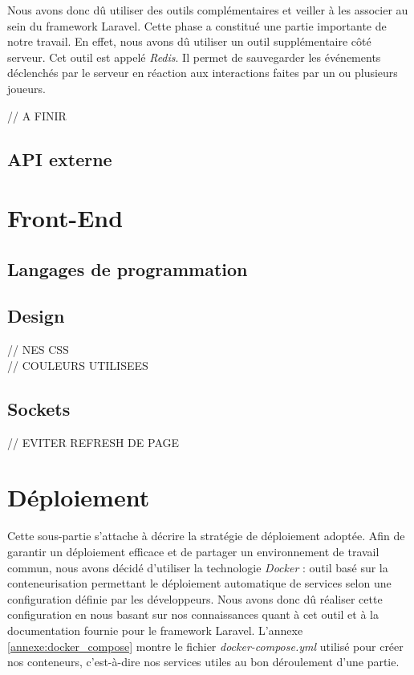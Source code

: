 \documentclass{tnreport}
\begin{document}
Nous avons donc dû utiliser des outils complémentaires et veiller à les associer au sein du framework Laravel. Cette phase a constitué une partie importante de notre travail. En effet, nous avons dû utiliser un outil supplémentaire côté serveur. Cet outil est appelé \textit{Redis}. Il permet de sauvegarder les événements déclenchés par le serveur en réaction aux interactions faites par un ou plusieurs joueurs.

// A FINIR

\subsection{API externe}

\section{Front-End}

\subsection{Langages de programmation}

\subsection{Design}

// NES CSS \\
// COULEURS UTILISEES

\subsection{Sockets}

// EVITER REFRESH DE PAGE

\section{Déploiement}

Cette sous-partie s'attache à décrire la stratégie de déploiement adoptée. Afin de garantir un déploiement efficace et de partager un environnement de travail commun, nous avons décidé d'utiliser la technologie \textit{Docker} : outil basé sur la conteneurisation permettant le déploiement automatique de services selon une configuration définie par les développeurs. Nous avons donc dû réaliser cette configuration en nous basant sur nos connaissances quant à cet outil et à la documentation fournie pour le framework Laravel. L'annexe \ref{annexe:docker_compose} montre le fichier \textit{docker-compose.yml} utilisé pour créer nos conteneurs, c'est-à-dire nos services utiles au bon déroulement d'une partie.
\end{document}
